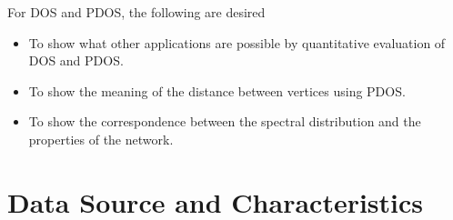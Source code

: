 \documentclass[senior,final,11pt]{iscs-thesis}
\begin{document}
For DOS and PDOS, the following are desired
\begin{itemize}
    \item To show what other applications are possible by quantitative evaluation of DOS and PDOS.
    \item To show the meaning of the distance between vertices using PDOS.
    \item To show the correspondence between the spectral distribution and the properties of the network.
\end{itemize}



\appendix
\chapter{Data Source and Characteristics}
\end{document}
